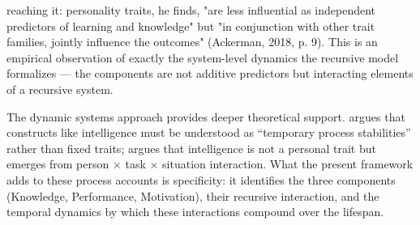 \documentclass[12pt,a4paper]{article}
\begin{document}
reaching it: personality traits, he finds, "are less influential as independent predictors of learning and knowledge" but "in conjunction with other trait families, jointly influence the outcomes" (Ackerman, 2018, p. 9). This is an empirical observation of exactly the system-level dynamics the recursive model formalizes ---\hspace{0pt} the components are not additive predictors but interacting elements of a recursive system.

The dynamic systems approach provides deeper theoretical support.  argues that constructs like intelligence must be understood as ``temporary process stabilities'' rather than fixed traits; \citet{SternbergAdaptive2021} argues that intelligence is not a personal trait but emerges from person $\times$ task $\times$ situation interaction. What the present framework adds to these process accounts is specificity: it identifies the three components (Knowledge, Performance, Motivation), their recursive interaction, and the temporal dynamics by which these interactions compound over the lifespan.
\end{document}
